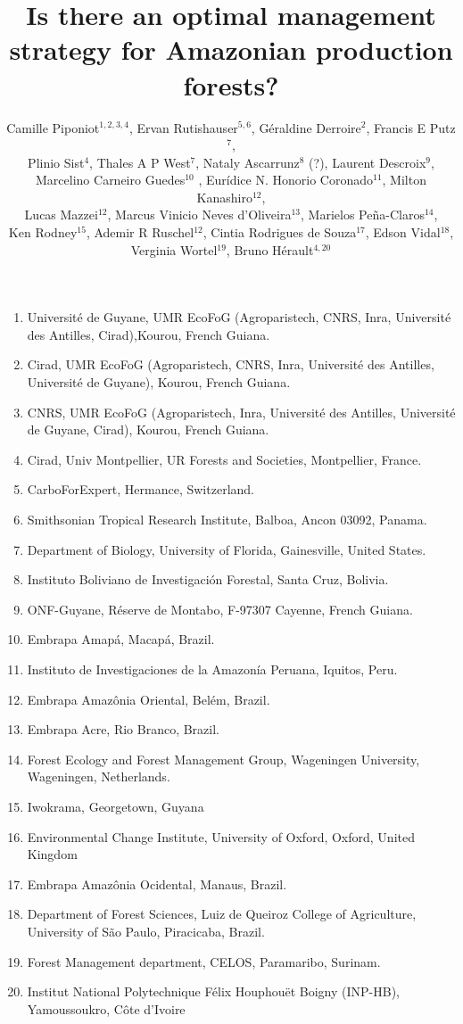 \documentclass{article}
\title{Is there an optimal management strategy for Amazonian production forests?}
\author{Camille Piponiot$^{1,2,3,4}$, Ervan Rutishauser$^{5,6}$, Géraldine Derroire$^{2}$, Francis E Putz$^{7}$,\\ Plinio Sist$^{4}$, Thales A P West$^{7}$, Nataly Ascarrunz$^{8}$ (?), Laurent Descroix$^{9}$,\\ Marcelino Carneiro Guedes$^{10}$ , Eur\'idice N. Honorio Coronado$^{11}$, Milton Kanashiro$^{12}$,\\ Lucas Mazzei$^{12}$, Marcus Vinicio Neves d’Oliveira$^{13}$, Marielos Peña-Claros$^{14}$, \\Ken Rodney$^{15}$, Ademir R Ruschel$^{12}$, Cintia Rodrigues de Souza$^{17}$, Edson Vidal$^{18}$, \\Verginia Wortel$^{19}$, Bruno Hérault$^{4,20}$}
\date{}
\begin{document}
\maketitle 

\begin{enumerate}
\item  Université  de  Guyane,  UMR  EcoFoG  (Agroparistech,  CNRS,  Inra,  Université  des  Antilles,  Cirad),Kourou, French Guiana.
\item Cirad,  UMR  EcoFoG  (Agroparistech,  CNRS,  Inra,  Université  des  Antilles,  Université  de  Guyane), Kourou, French Guiana.
\item CNRS,  UMR  EcoFoG  (Agroparistech,  Inra,  Université des  Antilles,  Université  de  Guyane,  Cirad), Kourou, French Guiana.
\item Cirad, Univ Montpellier, UR Forests and Societies, Montpellier, France.
\item CarboForExpert, Hermance, Switzerland.
\item Smithsonian Tropical Research Institute, Balboa, Ancon 03092, Panama.
\item Department of Biology, University of Florida, Gainesville, United States.
\item Instituto Boliviano de Investigación Forestal, Santa Cruz, Bolivia.
\item ONF-Guyane, Réserve de Montabo, F-97307 Cayenne, French Guiana.
\item Embrapa Amapá, Macapá, Brazil. 
\item Instituto de Investigaciones de la Amazonía Peruana, Iquitos, Peru.
\item Embrapa Amazônia Oriental, Belém, Brazil.
\item Embrapa Acre, Rio Branco, Brazil.
\item Forest Ecology and Forest Management Group, Wageningen University, Wageningen, Netherlands.
\item Iwokrama, Georgetown, Guyana
\item Environmental Change Institute, University of Oxford, Oxford, United Kingdom
\item Embrapa Amazônia Ocidental, Manaus, Brazil.
\item Department of Forest Sciences, Luiz de Queiroz College of Agriculture, University of São Paulo, Piracicaba, Brazil.
\item Forest Management department, CELOS, Paramaribo, Surinam.
\item Institut National Polytechnique Félix Houphouët Boigny (INP-HB), Yamoussoukro, Côte d’Ivoire

\end{enumerate}
\end{document}
